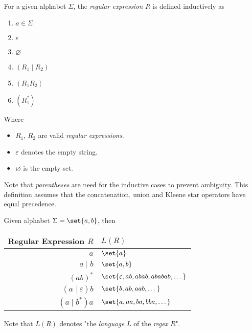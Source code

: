 \begin{definition}
    For a given alphabet $\Sigma$, the \textit{regular expression} $R$ is defined inductively as
    \begin{enumerate}
        \item $a \in \Sigma$
        \item $\varepsilon$
        \item $\varnothing$
        \item $(R_1 \mid R_2)$
        \item $(R_1 R_2)$
        \item $(R_1^{\ast})$
    \end{enumerate}
    Where
    \begin{itemize}
        \item $R_1$, $R_2$ are valid \textit{regular expressions}.
        \item $\varepsilon$ denotes the empty string.
        \item $\varnothing$ is the empty set.
    \end{itemize}
\end{definition}

\begin{remark}
    Note that \textit{parentheses} are need for the inductive cases to prevent ambiguity. This definition assumes that the concatenation, union and Kleene star operators have equal precedence.
\end{remark}

\begin{example}
    Given alphabet $\Sigma = \set{a, b}$, then
    \begin{table}[H]    
        \centering
        \begin{tabular}{@{} r  l @{}}
            \toprule
            Regular Expression $R$ & $L(R)$ \\
            \midrule
            $a$         & $\set{a}$ \\
            $a \mid b$  & $\set{a, b}$ \\
            $(ab)^\ast$ & 
                $\set{\varepsilon, ab, abab, ababab, \dots}$ \\
            $(a \mid \varepsilon)b$ & $\set{b, ab, aab, \dots}$ \\
            $(a \mid b^\ast)a$ & $\set{a, aa, ba, bba, \dots}$ \\
            \bottomrule
        \end{tabular}
    \end{table}
    
    Note that $L(R)$ denotes "the \textit{language} $L$ of the \textit{regex} $R$".
\end{example}

